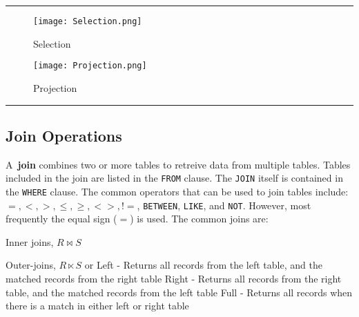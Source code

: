 \documentclass{article}
\begin{document}
\hspace{-0.5cm}\rule[-0.101in]{\textwidth}{0.0025in}
  
  
  


 \begin{figure}[htbp] %
    \centering
    \texttt{[image: Selection.png]} 
    \caption{Selection}
    \label{fig:selection}
 \end{figure}



  
  

 \begin{figure}[htbp] %
    \centering
    \texttt{[image: Projection.png]} 
    \caption{Projection}
    \label{fig:projection}
 \end{figure}





\hspace{-0.5cm}\rule[-0.101in]{\textwidth}{0.0025in}
  
     








\subsection*{Join Operations}


A\ \textbf{join} combines two or more tables to retreive data from multiple tables.  Tables included in the join are listed in the \texttt{FROM} clause.  The \texttt{JOIN} itself is contained in the \texttt{WHERE} clause.   The common operators that can be used to join tables include: $=, <, >, \le, \ge, <>, !=$, \texttt{BETWEEN}, \texttt{LIKE}, and \texttt{NOT}.  However, most frequently the equal sign ($=$) is used.          The common joins are:

\begin{outline}
        \1 Inner joins, $R \bowtie S$        
                
                
        \1 Outer-joins, $R \ltimes S$ or 
                \2 Left - Returns all records from the left table, and the matched records from the right table
                \2 Right - Returns all records from the right table, and the matched records from the left table
                \2 Full - Returns all records when there is a match in either left or right table
\end{outline}
\end{document}
